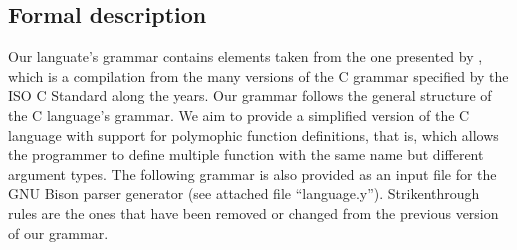 \subsection{Formal description}

Our languate's grammar contains elements taken from the one presented by \textcite{Harbison2002},
which is a compilation from the many versions of the C grammar specified by the ISO C Standard
along the years. Our grammar follows the general structure of the C language's grammar.
We aim to provide a simplified version of the C language with support for polymophic function
definitions, that is, which allows the programmer to define multiple function with the same name
but different argument types. The following grammar is also provided as an input file for the
GNU Bison \cite{BISON} parser generator (see attached file ``language.y''). Strikenthrough
rules are the ones that have been removed or changed from the previous version of our grammar.

